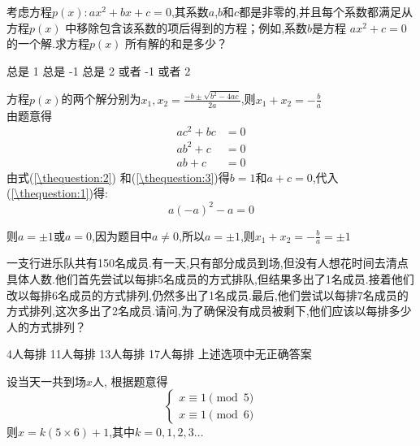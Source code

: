\documentclass[answers]{exam}
\begin{document}
\begin{questions}
	\question 考虑方程$p(x): ax^2 + bx + c=0$,其系数$a$,$b$和$c$都是非零的,并且每个系数都满足从方程$p(x)$
	中移除包含该系数的项后得到的方程；例如,系数$b$是方程 $ax^2+c=0$的一个解.求方程$p(x)$
	所有解的和是多少？

	\begin{oneparchoices}
		\choice 总是 1 \choice 总是 -1 \choice 总是 2  或者 -1  或者 2
	\end{oneparchoices}
	\begin{solution}
		方程$p(x)$的两个解分别为$\displaystyle x_1, x_2 = \frac{-b \pm \sqrt{b^2 - 4ac}}{2a}$,则$\displaystyle x_1 +
			x_2 = -\frac{b}{a}$\\
		由题意得
		\begin{align}
			ac^2  + bc & = 0 \label{\thequestion:1} \\
			ab^2  + c  & = 0 \label{\thequestion:2} \\
			ab    + c  & = 0 \label{\thequestion:3}
		\end{align}
		由式(\ref{\thequestion:2}) 和(\ref{\thequestion:3})得$b=1$和$a+c=0$,代入(\ref{\thequestion:1})得:
		\begin{equation}
			a(-a)^2 -a  = 0
		\end{equation}

		则$a=\pm 1$或$a=0$,因为题目中$a \ne 0$,所以$a=\pm 1$,则$\displaystyle x_1 + x_2 = -\frac{b}{a}=\pm 1$
	\end{solution}
	\question 一支行进乐队共有150名成员.有一天,只有部分成员到场,但没有人想花时间去清点具体人数.他们首先尝试以每排5名成员的方式排队,但结果多出了1名成员.接着他们改以每排6名成员的方式排列,仍然多出了1名成员.最后,他们尝试以每排7名成员的方式排列,这次多出了2名成员.请问,为了确保没有成员被剩下,他们应该以每排多少人的方式排列？

	\begin{oneparchoices}
		\choice 4人每排
		\CorrectChoice 11人每排
		\choice 13人每排
		\choice 17人每排
		\choice 上述选项中无正确答案
	\end{oneparchoices}
	\begin{solution}
		设当天一共到场$x$人, 根据题意得
		\begin{equation}
			\begin{cases}
				x \equiv 1 \pmod 5 \\
				x \equiv 1 \pmod 6
			\end{cases}
		\end{equation}
		则$x=k(5 \times 6) + 1$,其中$k=0,1,2,3 \ldots$


\end{solution}
\end{questions}
\end{document}
